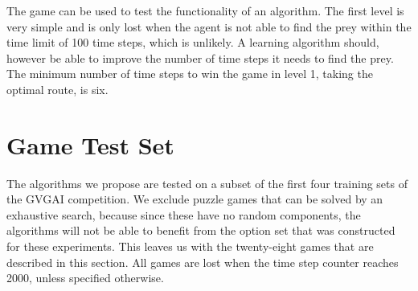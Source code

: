 The game can be used to test the functionality of an algorithm. The first level
is very simple and is only lost when the agent is not able to find the prey
within the time limit of 100 time steps, which is unlikely. A learning
algorithm should, however be able to improve the number of time steps it needs
to find the prey. The minimum number of time steps to win the game in level 1,
taking the optimal route, is six.

\section{Game Test Set}
\label{subsec:games}
The algorithms we propose are tested on a subset of the first four training sets
of the GVGAI competition. We exclude puzzle games that can be solved by an
exhaustive search, because since these have no random components, the algorithms
will not be able to benefit from the option set that was constructed for these
experiments. This leaves us with the twenty-eight games that are described in
this section. All games are lost when the time step counter reaches 2000, unless
specified otherwise.

